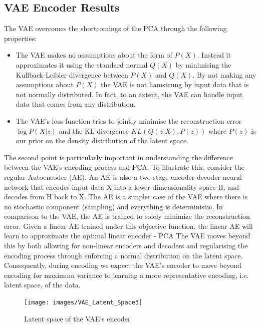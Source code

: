 \subsection{VAE Encoder Results}
The VAE overcomes the shortcomings of the PCA through the following properties:
\begin{itemize}
    \item The VAE makes no assumptions about the form of $P(X)$. Instead it approximates it using the standard normal $Q(X)$ by minimising the Kullback-Leibler divergence between $P(X)$ and $Q(X)$. By not making any assumptions about $P(X)$ the VAE is not hamstrung by input data that is not normally distributed. In fact, to an extent, the VAE can handle input data that comes from any distribution.
    \item The VAE's loss function tries to jointly minimise the reconstruction error $\log P(X|z)$ and the KL-divergence $KL (Q(z|X), P(z))$ where $P(z)$ is our prior on the density distribution of the latent space.
\end{itemize}
The second point is particularly important in understanding the difference between the VAE's encoding process and PCA. To illustrate this, consider the regular Autoencoder (AE). An AE is also a two-stage encoder-decoder neural network that encodes input data X into a lower dimensionality space H, and decodes from H back to X. The AE is a simpler case of the VAE where there is no stochastic component (sampling) and everything is deterministic. In comparison to the VAE, the AE is trained to solely minimize the reconstruction error. Given a linear AE trained under this objective function, the linear AE will learn to approximate the optimal linear encoder - PCA \citep{Goodfellow-et-al-2016} The VAE moves beyond this by both allowing for non-linear encoders and decoders and regularising the encoding process through enforcing a normal distribution on the latent space. Consequently, during encoding we expect the VAE's encoder to move beyond encoding for maximum variance to learning a more representative encoding, i.e. latent space, of the data. 

 \begin{figure}[htbp]
     \centering
     \texttt{[image: images/VAE\_Latent\_Space3]}
     \caption{Latent space of the VAE's encoder}
     \label{fig:vae_latent}
 \end{figure}

